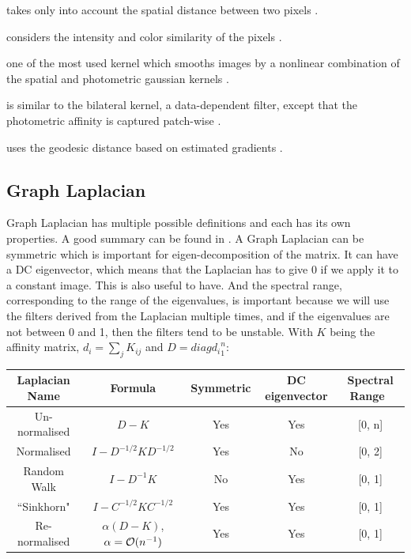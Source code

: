 \begin{description}[align=left]
 \item [Spatial Gaussian Kernel] takes only into account the spatial distance between two pixels \cite{siam_slides_2016}.
 \item [Photometric Gaussian Kernel] considers the intensity and color similarity of the pixels \cite{siam_slides_2016}.
 \item [Bilateral Kernel] one of the most used kernel which smooths images by a nonlinear combination of the spatial and photometric gaussian kernels \cite{siam_slides_2016} \cite{glide_2014}.
 \item [Non-Local Means (NLM)] is similar to the bilateral kernel, a data-dependent filter, except that the photometric affinity is captured patch-wise \cite{glide_2014}.
 \item [Locally Adaptive Regression Kernel (LARK)] uses the geodesic distance based on estimated gradients \cite{milanfar_symmetrizing_2013} \cite{takeda_kernel_2007}.
\end{description}

\subsection{Graph Laplacian}
\label{subsec:laplacian-variations}
Graph Laplacian has multiple possible definitions and each has its own properties.
A good summary can be found in \cite{siam_slides_2016}.
A Graph Laplacian can be symmetric which is important for eigen-decomposition of the matrix.
It can have a DC eigenvector, which means that the Laplacian has to give 0 if we apply it to a constant image. This is also useful to have.
And the spectral range, corresponding to the range of the eigenvalues, is important because we will use the filters derived from the Laplacian multiple times, and if the eigenvalues are not between 0 and 1, then the filters tend to be unstable.
With \(K\) being the affinity matrix, \(d_i = \sum_j K_{ij}\) and \(D = diag{d_i}^n_1\):

\begin{table}[!htbp]
 \centering
 \begin{tabular}{|c|c|c|c|c|}
  \hline
  Laplacian Name & Formula & Symmetric & DC eigenvector & Spectral Range \\
  \hline
  Un-normalised & \(D - K\) & Yes & Yes & [0, n] \\
  \hline
  Normalised & \(I - D^{-1/2}KD^{-1/2}\) & Yes & No & [0, 2] \\
  \hline
  Random Walk & \(I - D^{-1}K\) & No & Yes & [0, 1] \\
  \hline
  ``Sinkhorn" \cite{milanfar_symmetrizing_2013} & \(I - C^{-1/2}KC^{-1/2}\) & Yes & Yes & [0, 1] \\
  \hline
  Re-normalised & \(\alpha(D - K)\), \(\alpha = \operatorname{\mathcal{O}}(n^{-1})\) & Yes & Yes & [0, 1] \\
  \hline
 \end{tabular}
\end{table}

